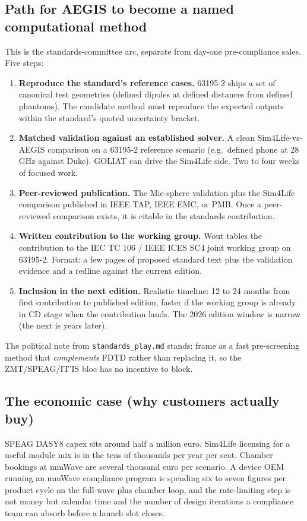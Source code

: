 \documentclass[11pt,a4paper]{article}
\begin{document}
\subsection*{Path for AEGIS to become a named computational method}
This is the standards-committee arc, separate from day-one pre-compliance sales. Five steps:

\begin{enumerate}
  \item \textbf{Reproduce the standard's reference cases.} 63195-2 ships a set of canonical test geometries (defined dipoles at defined distances from defined phantoms). The candidate method must reproduce the expected outputs within the standard's quoted uncertainty bracket.
  \item \textbf{Matched validation against an established solver.} A clean Sim4Life-vs-AEGIS comparison on a 63195-2 reference scenario (e.g.\ defined phone at 28\,GHz against Duke). GOLIAT can drive the Sim4Life side. Two to four weeks of focused work.
  \item \textbf{Peer-reviewed publication.} The Mie-sphere validation plus the Sim4Life comparison published in IEEE TAP, IEEE EMC, or PMB. Once a peer-reviewed comparison exists, it is citable in the standards contribution.
  \item \textbf{Written contribution to the working group.} Wout tables the contribution to the IEC TC 106 / IEEE ICES SC4 joint working group on 63195-2. Format: a few pages of proposed standard text plus the validation evidence and a redline against the current edition.
  \item \textbf{Inclusion in the next edition.} Realistic timeline: 12 to 24 months from first contribution to published edition, faster if the working group is already in CD stage when the contribution lands. The 2026 edition window is narrow (the next is years later).
\end{enumerate}

The political note from \texttt{standards\_play.md} stands: frame as a fast pre-screening method that
\emph{complements} FDTD rather than replacing it, so the ZMT/SPEAG/IT'IS bloc has no incentive to block.

\subsection*{The economic case (why customers actually buy)}
SPEAG DASY8 capex sits around half a million euro. Sim4Life licensing for a useful module mix is in the
tens of thousands per year per seat. Chamber bookings at mmWave are several thousand euro per scenario.
A device OEM running an mmWave compliance program is spending six to seven figures per product cycle on
the full-wave plus chamber loop, and the rate-limiting step is not money but calendar time and the number
of design iterations a compliance team can absorb before a launch slot closes.
\end{document}
